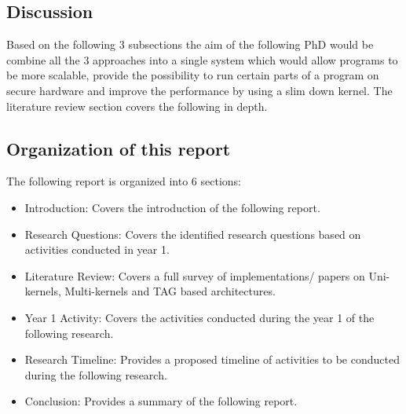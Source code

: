 \subsection{Discussion}
Based on the following 3 subsections the aim of the 
following PhD would be combine all the 3 approaches into a 
single system which would allow programs to be more scalable, 
provide the possibility to run certain parts of a program on secure 
hardware and improve the performance by using a slim down kernel. 
The literature review section covers the following in depth. 

\subsection{Organization of this report}
The following report is organized into 6 sections:
\begin{itemize}
    \item Introduction: Covers the introduction of the following report.
    \item Research Questions: Covers the identified research questions 
    based on activities conducted in year 1.
    \item Literature Review: Covers a full survey of implementations/ papers 
    on Uni-kernels, Multi-kernels and TAG based architectures.
    \item Year 1 Activity: Covers the activities conducted during the year 1 
    of the following research.
    \item Research Timeline: Provides a proposed timeline of activities to be conducted 
    during the following research.
    \item Conclusion: Provides a summary of the following report.
\end{itemize}


